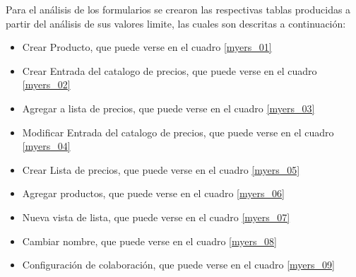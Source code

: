Para el análisis de los formularios se crearon las respectivas tablas producidas
a partir del análisis de sus valores limite, las cuales son descritas a
continuación:

\begin{itemize}
\item Crear Producto, que puede verse en el cuadro \ref{myers_01}
\item Crear Entrada del catalogo de precios, que puede verse en el cuadro \ref{myers_02}
\item Agregar a lista de precios, que puede verse en el cuadro \ref{myers_03}
\item Modificar Entrada del catalogo de precios, que puede verse en el cuadro \ref{myers_04}
\item Crear Lista de precios, que puede verse en el cuadro \ref{myers_05}
\item Agregar productos, que puede verse en el cuadro \ref{myers_06}
\item Nueva vista de lista, que puede verse en el cuadro \ref{myers_07}
\item Cambiar nombre, que puede verse en el cuadro \ref{myers_08}
\item Configuración de colaboración, que puede verse en el cuadro \ref{myers_09}
\end{itemize}

